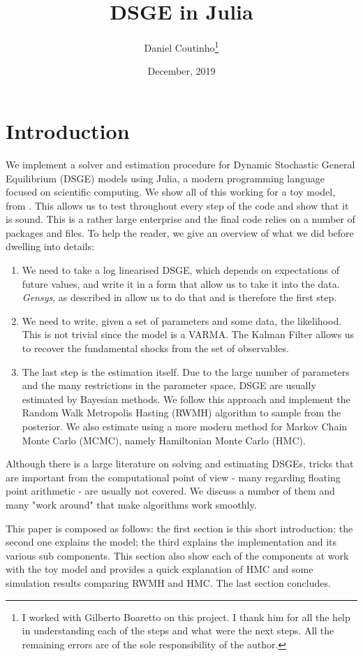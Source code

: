\documentclass[12pt,a4paper]{article}
\title{ DSGE in Julia }
\author{Daniel Coutinho\footnote{I worked with Gilberto Boaretto on this project. I thank him for all the help in understanding each of the steps and what were the next steps. All the remaining errors are of the sole responsibility of the author.}}
\date{ December, 2019 }
\begin{document}
\maketitle

\section{Introduction}
We implement a solver and estimation procedure for Dynamic Stochastic General Equilibrium (DSGE) models using Julia, a modern programming language focused on scientific computing. We show all of this working for a toy model, from \cite{Gali2009}. This allows us to test throughout every step of the code and show that it is sound. This is a rather large enterprise and the final code relies on a number of packages and files. To help the reader, we give an overview of what we did before dwelling into details:

\begin{enumerate}
\item We need to take a log linearised DSGE, which depends on expectations of future values, and write it in a form that allow us to take it into the data. \emph{Gensys}, as described in \cite{Sims2002} allow us to do that and is therefore the first step.


\item We need to write, given a set of parameters and some data, the likelihood. This is not trivial since the model is a VARMA. The Kalman Filter allows us to recover the fundamental shocks from the set of observables.


\item The last step is the estimation itself. Due to the large number of parameters and the many restrictions in the parameter space, DSGE are usually estimated by Bayesian methods. We follow this approach and implement the Random Walk Metropolis Hasting (RWMH) algorithm to sample from the posterior. We also estimate using a more modern method for Markov Chain Monte Carlo (MCMC), namely Hamiltonian Monte Carlo (HMC).

\end{enumerate}

Although there is a large literature on solving and estimating DSGEs, tricks that are important from the computational point of view - many regarding floating point arithmetic - are usually not covered. We discuss a number of them and many "work around" that make algorithms work smoothly.

This paper is composed as follows: the first section is this short introduction; the second one explains the model; the third explains the implementation and its various sub components. This section also show each of the components at work with the toy model and provides a quick explanation of HMC and some simulation results comparing RWMH and HMC. The last section concludes.
\end{document}

